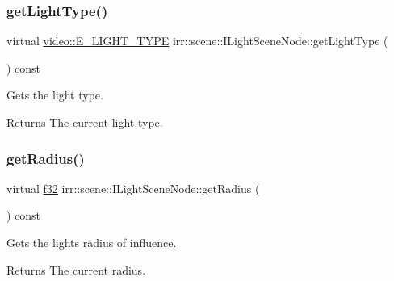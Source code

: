 \subsubsection{\texorpdfstring{get\+Light\+Type()}{getLightType()}\hspace{0.1cm}{\footnotesize\ttfamily [2/2]}}
{\footnotesize\ttfamily virtual \hyperlink{namespaceirr_1_1video_aaf0e02f6f83cc35cf9e764bf18400d39}{video\+::\+E\+\_\+\+L\+I\+G\+H\+T\+\_\+\+T\+Y\+PE} irr\+::scene\+::\+I\+Light\+Scene\+Node\+::get\+Light\+Type (\begin{DoxyParamCaption}{ }\end{DoxyParamCaption}) const\hspace{0.3cm}{\ttfamily [pure virtual]}}



Gets the light type. 

\begin{DoxyReturn}{Returns}
The current light type. 
\end{DoxyReturn}
\mbox{\label{classirr_1_1scene_1_1ILightSceneNode_a4ce3cd789ed3adabd381ff7f915861a0}} 
\subsubsection{\texorpdfstring{get\+Radius()}{getRadius()}\hspace{0.1cm}{\footnotesize\ttfamily [1/2]}}
{\footnotesize\ttfamily virtual \hyperlink{namespaceirr_a0277be98d67dc26ff93b1a6a1d086b07}{f32} irr\+::scene\+::\+I\+Light\+Scene\+Node\+::get\+Radius (\begin{DoxyParamCaption}{ }\end{DoxyParamCaption}) const\hspace{0.3cm}{\ttfamily [pure virtual]}}



Gets the light\textquotesingle{}s radius of influence. 

\begin{DoxyReturn}{Returns}
The current radius. 
\end{DoxyReturn}
\mbox{\label{classirr_1_1scene_1_1ILightSceneNode_a4ce3cd789ed3adabd381ff7f915861a0}} 
